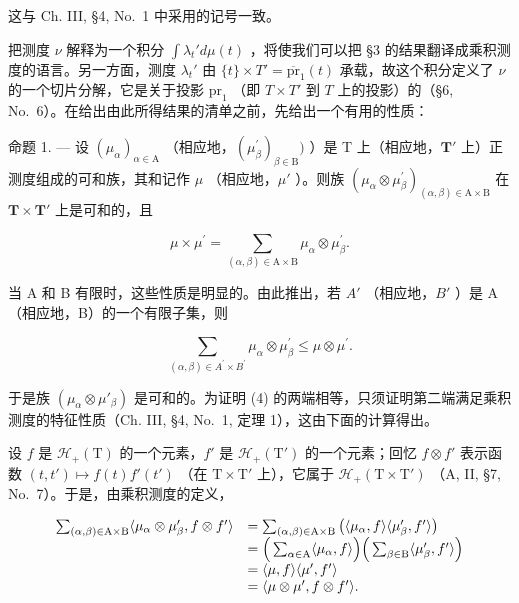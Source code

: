 这与 Ch. III, §4, No.~1 中采用的记号一致。

把测度 \(\nu\) 解释为一个积分 \(\int \lambda_t' d\mu(t)\) ，将使我们可以把 §3 的结果翻译成乘积测度的语言。另一方面，测度 \(\lambda_t'\) 由 \(\{t\} \times T' = \overline{\text{pr}}_1(t)\) 承载，故这个积分定义了 \(\nu\) 的一个切片分解，它是关于投影 \(\text{pr}_1\) （即 \(T \times T'\) 到 \(T\) 上的投影）的（§6, No.~6）。在给出由此所得结果的清单之前，先给出一个有用的性质：

命题 1. --- 设 \((\mu_{\alpha})_{\alpha \in \mathrm{A}}\) （相应地，\((\mu_{\beta}^{\prime})_{\beta \in \mathrm{B}})\) ）是 T 上（相应地，\(\mathbf{T}'\) 上）正测度组成的可和族，其和记作 \(\mu\) （相应地，\(\mu'\) ）。则族 \((\mu_{\alpha} \otimes \mu_{\beta}^{\prime})_{(\alpha, \beta) \in \mathrm{A} \times \mathrm{B}}\) 在 \(\mathbf{T} \times \mathbf{T}'\) 上是可和的，且

\[
\mu \times \mu^ {\prime} = \sum_ {(\alpha , \beta) \in \mathrm{A} \times \mathrm{B}} \mu_ {\alpha} \otimes \mu_ {\beta} ^ {\prime}.\tag{4}
\]

当 A 和 B 有限时，这些性质是明显的。由此推出，若 \(A'\) （相应地，\(B'\) ）是 A（相应地，B）的一个有限子集，则

\[
\sum_ {(\alpha , \beta) \in A ^ {\prime} \times B ^ {\prime}} \mu_ {\alpha} \otimes \mu_ {\beta} ^ {\prime} \leqslant \mu \otimes \mu^ {\prime}.
\]

于是族 \((\mu_{\alpha} \otimes \mu'_{\beta})\) 是可和的。为证明 (4) 的两端相等，只须证明第二端满足乘积测度的特征性质（Ch. III, §4, No.~1, 定理 1），这由下面的计算得出。

设 \(f\) 是 \(\mathcal{H}_{+}(\mathrm{T})\) 的一个元素，\(f'\) 是 \(\mathcal{H}_{+}(\mathrm{T}')\) 的一个元素；回忆 \(f \otimes f'\) 表示函数 \((t, t') \mapsto f(t)f'(t')\) （在 \(\mathrm{T} \times \mathrm{T}'\) 上），它属于 \(\mathcal{H}_{+}(\mathrm{T} \times \mathrm{T}')\) （A, II, §7, No.~7）。于是，由乘积测度的定义，

\[
\begin{array}{r l} \sum_ {(\alpha , \beta) \in \mathrm{A} \times \mathrm{B}} \langle \mu_ {\alpha} \otimes \mu_ {\beta} ^ {\prime}, f \otimes f ^ {\prime} \rangle & = \sum_ {(\alpha , \beta) \in \mathrm{A} \times \mathrm{B}} \big (\langle \mu_ {\alpha}, f \rangle \langle \mu_ {\beta} ^ {\prime}, f ^ {\prime} \rangle \big) \\ & = \Big (\sum_ {\alpha \in \mathrm{A}} \langle \mu_ {\alpha}, f \rangle \Big) \Big (\sum_ {\beta \in \mathrm{B}} \langle \mu_ {\beta} ^ {\prime}, f ^ {\prime} \rangle \Big) \\ & = \langle \mu , f \rangle \langle \mu^ {\prime}, f ^ {\prime} \rangle \\ & = \langle \mu \otimes \mu^ {\prime}, f \otimes f ^ {\prime} \rangle . \end{array}
\]

